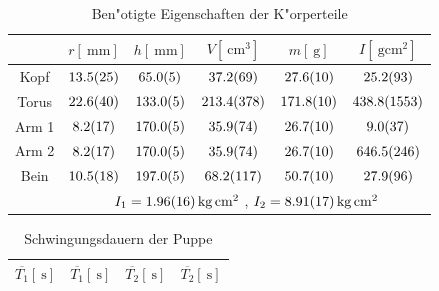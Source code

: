 				\begin{table}[h!]
					\begin{center}
						\caption{Ben"otigte Eigenschaften der K"orperteile\label{tabelle:puppeneigenschaften}}
						\begin{tabular}{|c||c|c|c|c|c|}
							\hline
								 &
								$r [\SI{}{\milli \meter}]$ &
								$h [\SI{}{\milli \meter}]$ &
								$V [\SI{}{\centi \meter \cubed}]$ &
								$m [\SI{}{\gram}]$ &
								$I [\SI{}{\gram \centi \meter \squared}]$ \\
							\hline 
							\hline
								Kopf &
								$\SI{13.5 (25)}{} $ &
								$\SI{65.0 (5)}{}$ &
								$\SI{37.2 (69)}{}$&
								$\SI{27.6 (10)}{}$&
								$\SI{25.2 (93)}{}$\\
							\hline 
								Torus &
								$\SI{22.6 (40)}{} $ &
								$\SI{133.0 (5)}{}$ &
								$\SI{213.4 (378)}{}$&
								$\SI{171.8 (10)}{}$&
								$\SI{438.8 (1553)}{}$\\
							\hline 
								Arm 1 &
								$\SI{8.2 (17)}{}$ &
								$\SI{170.0 (5)}{}$ &
								$\SI{35.9 (74)}{}$&
								$\SI{26.7 (10)}{}$&
								$\SI{9.0 (37)}{}$\\
							\hline 
								Arm 2 &
								$\SI{8.2 (17)}{}$ &
								$\SI{170.0 (5)}{}$ &
								$\SI{35.9 (74)}{}$&
								$\SI{26.7 (10)}{}$&
								$\SI{646.5 (246)}{}$\\
							\hline 
								Bein &
								$\SI{10.5 (18)}{}  $& 
								$\SI{197.0 (5)}{}$ &
								$\SI{68.2 (117)}{}$&
								$\SI{50.7 (10)}{}$&
								$\SI{27.9 (96)}{}$\\
							\hline
							\hline
								 &
								\multicolumn{5}{c|}{$I_1 = \SI{1.96 (16)}{\kilo \gram \centi \meter \squared}$ \quad , \quad $I_2 = \SI{8.91 (17)}{\kilo \gram \centi \meter \squared}$} \\
							\hline
						\end{tabular}
					\end{center}
				\end{table}

				\begin{table}[h!]
					\begin{center}
						\caption{Schwingungsdauern der Puppe\label{tabelle:puppe}}
						\begin{tabular}{|c||c||c||c|}
							\hline
							$\overline{T_1} [\SI{}{\second}]$ & $\overline{T_1} [\SI{}{\second}]$ & $\overline{T_2} [\SI{}{\second}]$ & $\overline{T_2} [\SI{}{\second}]$ \\
							\hline 
							\hline
							
							\hline 
						\end{tabular}
					\end{center}
				\end{table}

				\clearpage
